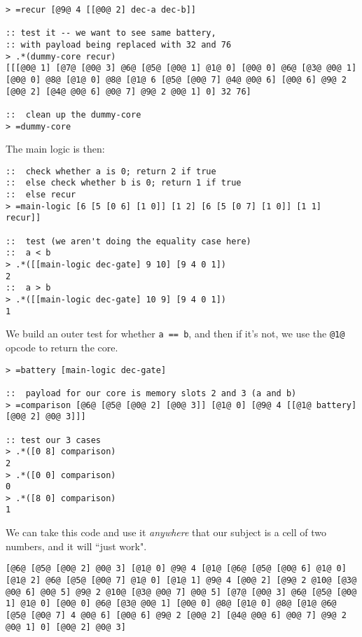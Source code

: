 \documentclass[twoside]{article}
\begin{document}
\begin{lstlisting}[style=listingcode]
> =recur [@9@ 4 [[@0@ 2] dec-a dec-b]]

:: test it -- we want to see same battery,
:: with payload being replaced with 32 and 76
> .*(dummy-core recur)
[[[@0@ 1] [@7@ [@0@ 3] @6@ [@5@ [@0@ 1] @1@ 0] [@0@ 0] @6@ [@3@ @0@ 1] [@0@ 0] @8@ [@1@ 0] @8@ [@1@ 6 [@5@ [@0@ 7] @4@ @0@ 6] [@0@ 6] @9@ 2 [@0@ 2] [@4@ @0@ 6] @0@ 7] @9@ 2 @0@ 1] 0] 32 76]

::  clean up the dummy-core
> =dummy-core
\end{lstlisting}

The main logic is then:

\begin{lstlisting}[style=listingcode]
::  check whether a is 0; return 2 if true
::  else check whether b is 0; return 1 if true
::  else recur
> =main-logic [6 [5 [0 6] [1 0]] [1 2] [6 [5 [0 7] [1 0]] [1 1] recur]]

::  test (we aren't doing the equality case here)
::  a < b
> .*([[main-logic dec-gate] 9 10] [9 4 0 1])
2
::  a > b
> .*([[main-logic dec-gate] 10 9] [9 4 0 1])
1
\end{lstlisting}


We build an outer test for whether \lstinline[style=inlinecode]{a == b}, and then if it's not, we use the \lstinline[style=inlinecode]{@1@} opcode to return the core.

\begin{lstlisting}[style=listingcode]
> =battery [main-logic dec-gate]

::  payload for our core is memory slots 2 and 3 (a and b)
> =comparison [@6@ [@5@ [@0@ 2] [@0@ 3]] [@1@ 0] [@9@ 4 [[@1@ battery] [@0@ 2] @0@ 3]]]

:: test our 3 cases
> .*([0 8] comparison)
2
> .*([0 0] comparison)
0
> .*([8 0] comparison)
1
\end{lstlisting}

We can take this code and use it \emph{anywhere} that our subject is a cell of two numbers, and it will ``just work".

\begin{lstlisting}[style=listingcode]
[@6@ [@5@ [@0@ 2] @0@ 3] [@1@ 0] @9@ 4 [@1@ [@6@ [@5@ [@0@ 6] @1@ 0] [@1@ 2] @6@ [@5@ [@0@ 7] @1@ 0] [@1@ 1] @9@ 4 [@0@ 2] [@9@ 2 @10@ [@3@ @0@ 6] @0@ 5] @9@ 2 @10@ [@3@ @0@ 7] @0@ 5] [@7@ [@0@ 3] @6@ [@5@ [@0@ 1] @1@ 0] [@0@ 0] @6@ [@3@ @0@ 1] [@0@ 0] @8@ [@1@ 0] @8@ [@1@ @6@ [@5@ [@0@ 7] 4 @0@ 6] [@0@ 6] @9@ 2 [@0@ 2] [@4@ @0@ 6] @0@ 7] @9@ 2 @0@ 1] 0] [@0@ 2] @0@ 3]
\end{lstlisting}
\end{document}
